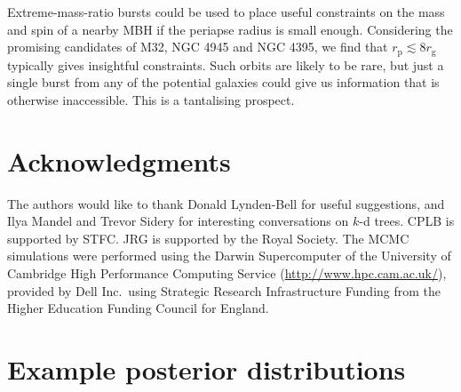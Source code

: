 \documentclass[useAMS,usedcolumn,usegraphicx,usenatbib]{mn2e}
\newcommand{\sub}[1]{\ensuremath{_\mathrm{#1}}}
\begin{document}
Extreme-mass-ratio bursts could be used to place useful constraints on the mass and spin of a nearby MBH if the periapse radius is small enough. Considering the promising candidates of M32, NGC 4945 and NGC 4395, we find that $r\sub{p} \lesssim 8 r\sub{g}$ typically gives insightful constraints. Such orbits are likely to be rare, but just a single burst from any of the potential galaxies could give us information that is otherwise inaccessible. This is a tantalising prospect.

\section*{Acknowledgments}

The authors would like to thank Donald Lynden-Bell for useful suggestions, and Ilya Mandel and Trevor Sidery for interesting conversations on $k$-d trees. CPLB is supported by STFC. JRG is supported by the Royal Society. The MCMC simulations were performed using the Darwin Supercomputer of the University of Cambridge High Performance Computing Service (\url{http://www.hpc.cam.ac.uk/}), provided by Dell Inc.\ using Strategic Research Infrastructure Funding from the Higher Education Funding Council for England.




\appendix

\section{Example posterior distributions}\label{ap:posterior}
\end{document}
